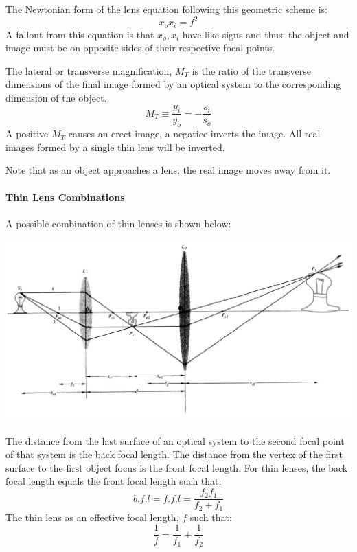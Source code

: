 \documentclass[12pt]{report}
\begin{document}
The Newtonian form of the lens equation following this geometric scheme is: 
\begin{equation}
x_ox_i = f^2
\end{equation}
A fallout from this equation is that $x_o, x_i$ have like signs and thus: the object and image must be on opposite sides of their respective focal points. 

The lateral or transverse magnification, $M_T$ is the ratio of the transverse dimensions of the final image formed by an optical system to the corresponding dimension of the object. 
\begin{equation}
M_T \equiv \frac{y_i}{y_o} = -\frac{s_i}{s_o}
\end{equation}
A positive $M_T$ causes an erect image, a negatice inverts the image. All real images formed by a single thin lens will be inverted. 

Note that as an object approaches a lens, the real image moves away from it. 
\paragraph{Thin Lens Combinations}
A possible combination of thin lenses is shown below:

\includegraphics[scale=.45]{ThinLensCombo.jpg}

The distance from the last surface of an optical system to the second focal point of that system is the back focal length. The distance from the vertex of the first surface to the first object focus is the front focal length. For thin lenses, the back focal length equals the front focal length such that:
\[b.f.l = f. f.l = \frac{f_2f_1}{f_2+f_1}\]
The thin lens as an effective focal length, $f$ such that:
\begin{equation}
\frac{1}{f} = \frac{1}{f_1}+\frac{1}{f_2}
\end{equation}
\end{document}
